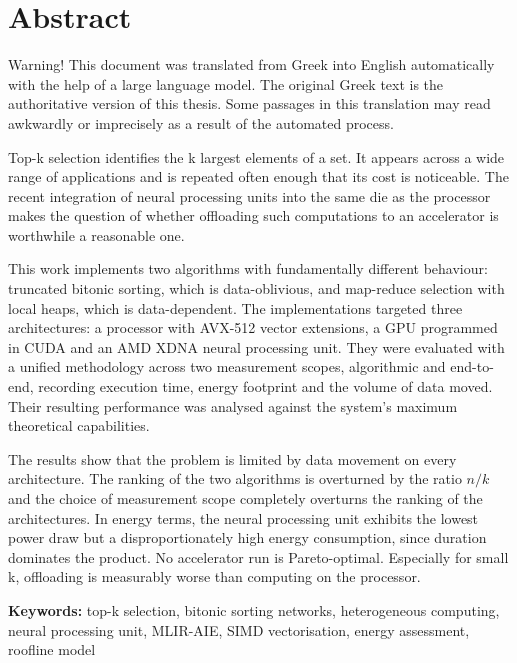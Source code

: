 \chapter*{Abstract}
\label{ch:abstract-en}

\begin{tcolorbox}[
  colback=black!3,
  colframe=black!45,
  boxrule=0.5pt,
  arc=2pt,
  left=8pt, right=8pt, top=6pt, bottom=6pt,
  title=\textbf{Note on this translation},
  colbacktitle=black!10,
  coltitle=black,
  fonttitle=\normalsize,
  titlerule=0pt
]
\small
Warning! This document was translated from Greek into English automatically
with the help of a large language model. The original Greek text is the
authoritative version of this thesis. Some passages in this translation may
read awkwardly or imprecisely as a result of the automated process.
\end{tcolorbox}

Top-k selection identifies the k largest elements of a set. It appears across a
wide range of applications and is repeated often enough that its cost is
noticeable. The recent integration of neural processing units into the same die
as the processor makes the question of whether offloading such computations to
an accelerator is worthwhile a reasonable one.

This work implements two algorithms with fundamentally different behaviour:
truncated bitonic sorting, which is data-oblivious, and map-reduce selection
with local heaps, which is data-dependent. The implementations targeted three
architectures: a processor with AVX-512 vector extensions, a GPU programmed in
CUDA and an AMD XDNA neural processing unit. They were evaluated with a unified
methodology across two measurement scopes, algorithmic and end-to-end,
recording execution time, energy footprint and the volume of data moved. Their
resulting performance was analysed against the system's maximum theoretical
capabilities.

The results show that the problem is limited by data movement on every
architecture. The ranking of the two algorithms is overturned by the ratio
$n/k$ and the choice of measurement scope completely overturns the ranking of
the architectures. In energy terms, the neural processing unit exhibits the
lowest power draw but a disproportionately high energy consumption, since
duration dominates the product. No accelerator run is Pareto-optimal.
Especially for small k, offloading is measurably worse than computing on the
processor.

\vspace{1em}

\textbf{Keywords:} top-k selection, bitonic sorting networks, heterogeneous
computing, neural processing unit, MLIR-AIE, SIMD vectorisation, energy
assessment, roofline model
